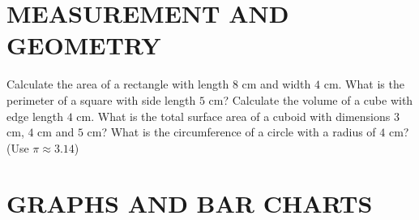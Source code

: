 \documentclass{exam}
\begin{document}
\section{MEASUREMENT AND GEOMETRY}
\begin{questions}
\question Calculate the area of a rectangle with length $8$ cm and width $4$ cm.
\question What is the perimeter of a square with side length $5$ cm?
\question Calculate the volume of a cube with edge length $4$ cm.
\question What is the total surface area of a cuboid with dimensions $3$ cm, $4$ cm and $5$ cm?
\question What is the circumference of a circle with a radius of $4$ cm? (Use $\pi \approx 3.14$)
\end{questions}

\section{GRAPHS AND BAR CHARTS}
\end{document}
